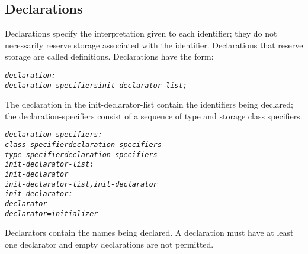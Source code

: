 \documentclass[12pt]{report}
\begin{document}
\subsection{Declarations}
\begin{doublespace}
Declarations specify the interpretation given to each identifier; they do not necessarily reserve storage associated with the identifier. Declarations that reserve storage are called definitions. Declarations have the form:
\begin{singlespace}
\begin{alltt}
         \textit{declaration:}
              \textit{declaration-specifiers init-declarator-list;}
\end{alltt}
\end{singlespace}
The declaration in the init-declarator-list contain the identifiers being declared; the declaration-specifiers consist of a sequence of type and storage class specifiers.
\begin{singlespace}
\begin{alltt}
         \textit{declaration-specifiers:}
              \textit{class-specifier declaration-specifiers}
              \textit{type-specifier declaration-specifiers}
         \textit{init-declarator-list:}
              \textit{init-declarator}
              \textit{init-declarator-list , init-declarator}
         \textit{init-declarator:}
              \textit{declarator}
              \textit{declarator = initializer}
\end{alltt}
\end{singlespace}
Declarators contain the names being declared. A declaration must have at least one declarator and empty declarations are not permitted.
\end{doublespace}
\end{document}

